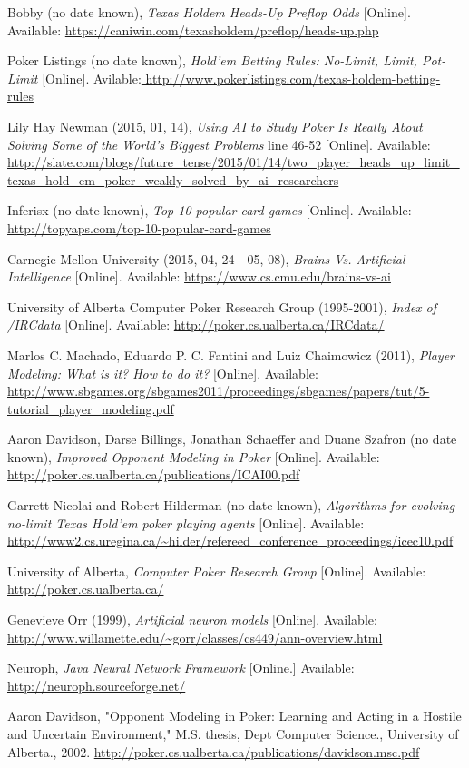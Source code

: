 \begin{thebibliography}{100} 
 Bobby (no date known), \emph{Texas Holdem Heads-Up Preflop Odds} [Online]. Available: \url{https://caniwin.com/texasholdem/preflop/heads-up.php}

 Poker Listings (no date known), \emph {Hold'em Betting Rules: No-Limit, Limit, Pot-Limit} [Online]. Avilable:\url{ http://www.pokerlistings.com/texas-holdem-betting-rules}


 Lily Hay Newman (2015, 01, 14), \emph{Using AI to Study Poker Is Really About Solving Some of the World’s Biggest Problems} line 46-52 [Online]. Available: \url{http://slate.com/blogs/future_tense/2015/01/14/two_player_heads_up_limit_texas_hold_em_poker_weakly_solved_by_ai_researchers}


 Inferisx (no date known), \emph{ Top 10 popular card games} [Online]. Available: \url{http://topyaps.com/top-10-popular-card-games}

 Carnegie Mellon University (2015, 04, 24 - 05, 08), \emph{Brains Vs. Artificial Intelligence} [Online]. Available: \url{https://www.cs.cmu.edu/brains-vs-ai}


 University of Alberta Computer Poker Research Group (1995-2001), \emph{Index of /IRCdata} [Online]. Available: \url{http://poker.cs.ualberta.ca/IRCdata/}


 Marlos C. Machado, Eduardo P. C. Fantini and Luiz Chaimowicz (2011), \emph{Player Modeling: What is it? How to do it?} [Online]. Available: \url{http://www.sbgames.org/sbgames2011/proceedings/sbgames/papers/tut/5-tutorial_player_modeling.pdf}


 Aaron Davidson, Darse Billings, Jonathan Schaeffer and Duane Szafron (no date known), \emph{Improved Opponent Modeling in Poker} [Online]. Available: \url{http://poker.cs.ualberta.ca/publications/ICAI00.pdf}


 Garrett Nicolai and Robert Hilderman (no date known), \emph{Algorithms for evolving no-limit Texas Hold'em poker playing agents} [Online]. Available: \url{http://www2.cs.uregina.ca/~hilder/refereed_conference_proceedings/icec10.pdf}


 University of Alberta, \emph{Computer Poker Research Group} [Online]. Available: \url{http://poker.cs.ualberta.ca/}

 Genevieve Orr (1999), \emph{ Artificial neuron models} [Online]. Available: \url{http://www.willamette.edu/~gorr/classes/cs449/ann-overview.html}

 Neuroph, \emph{Java Neural Network Framework} [Online.] Available: \url{http://neuroph.sourceforge.net/}


 Aaron Davidson, "Opponent Modeling in Poker: Learning and Acting in a Hostile and Uncertain Environment," M.S. thesis, Dept Computer Science., University of Alberta., 2002. \url{http://poker.cs.ualberta.ca/publications/davidson.msc.pdf}


\end{thebibliography}